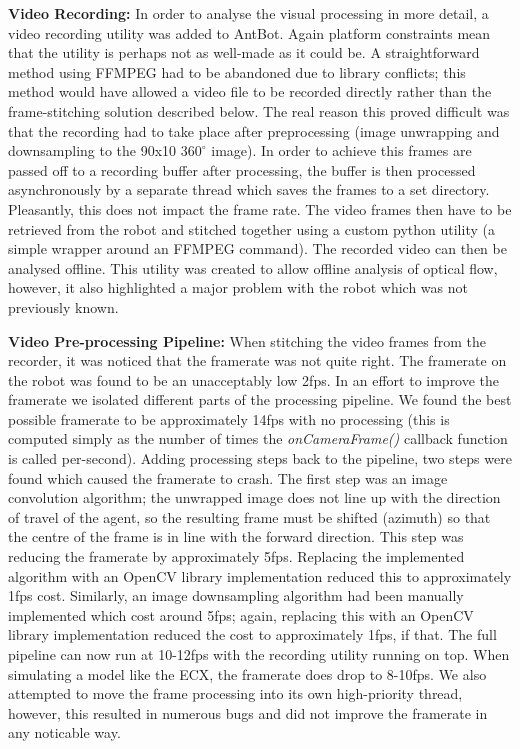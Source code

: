 \documentclass[a4paper,11pt,twoside,openright]{article}
\begin{document}
\textbf{Video Recording:} In order to analyse the visual processing in
more detail, a video recording utility was added to AntBot. Again
platform constraints mean that the utility is perhaps not as well-made
as it could be. A straightforward method using FFMPEG had to be
abandoned due to library conflicts; this method would have allowed a
video file to be recorded directly rather than the frame-stitching
solution described below. The real reason this proved difficult was
that the recording had to take place after preprocessing (image
unwrapping and downsampling to the 90x10 $360^{\circ}$ image). In
order to achieve this frames are passed off to a recording buffer
after processing, the buffer is then processed asynchronously by a
separate thread which saves the frames to a set directory. Pleasantly,
this does not impact the frame rate. The video frames then have to be
retrieved from the robot and stitched together using a custom python
utility (a simple wrapper around an FFMPEG command). The recorded
video can then be analysed offline. This utility was created to allow
offline analysis of optical flow, however, it also highlighted a major
problem with the robot which was not previously known.
\newline
\par

\textbf{Video Pre-processing Pipeline:}
When stitching the video frames from the recorder, it was noticed that the
framerate was not quite right. The framerate on the robot was found to be
an unacceptably low 2fps. In an effort to improve the framerate we isolated
different parts of the processing pipeline. We found the best possible
framerate to be approximately 14fps with no processing (this is computed simply
as the number of times the \textit{onCameraFrame()} callback function is called
per-second). Adding processing steps back to the pipeline, two steps were found
which caused the framerate to crash. The first step was an image convolution
algorithm; the unwrapped image does not line up with the direction of travel of
the agent, so the resulting frame must be shifted (azimuth) so that the centre of
the frame is in line with the forward direction. This step was reducing the
framerate by approximately 5fps. Replacing the implemented algorithm with an
OpenCV library implementation reduced this to approximately 1fps cost. Similarly,
an image downsampling algorithm had been manually implemented which cost around
5fps; again, replacing this with an OpenCV library implementation reduced the
cost to approximately 1fps, if that. The full pipeline can now run at 10-12fps
with the recording utility running on top. When simulating a model like the ECX,
the framerate does drop to 8-10fps. We also attempted to move the frame
processing into its own high-priority thread, however, this resulted in numerous
bugs and did not improve the framerate in any noticable way.
\newline
\par
\end{document}
